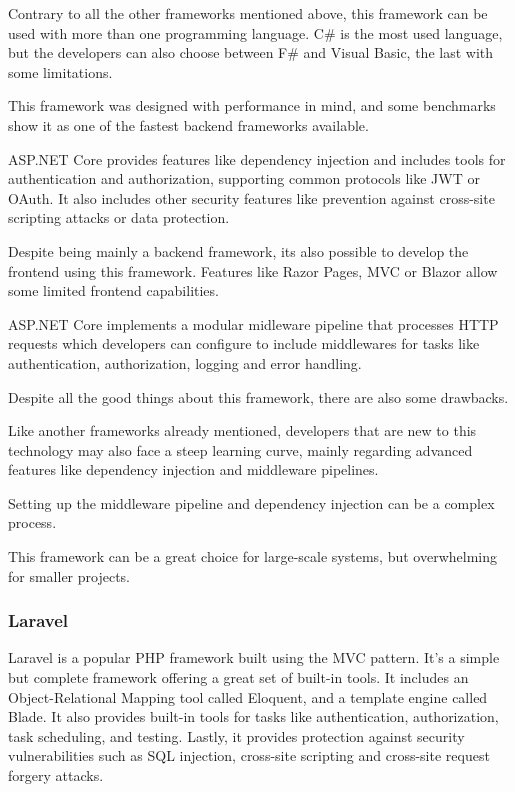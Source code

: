 Contrary to all the other frameworks mentioned above, this framework can be
used with more than one programming language. C\# is the most used language, but
the developers can also choose between F\# and Visual Basic, the last with some
limitations.

This framework was designed with performance in mind, and some benchmarks show
it as one of the fastest backend frameworks available.

ASP.NET Core provides features like dependency injection and includes tools for
authentication and authorization, supporting common protocols like \gls{JWT} or OAuth.
It also includes other security features like prevention against cross-site
scripting attacks or data protection.

Despite being mainly a backend framework, its also possible to develop the
frontend using this framework. Features like Razor Pages, \gls{MVC} or Blazor allow
some limited frontend capabilities.

ASP.NET Core implements a modular midleware pipeline that processes \gls{HTTP}
requests which developers can configure to include middlewares for tasks like
authentication, authorization, logging and error handling.

Despite all the good things about this framework, there are also some drawbacks.

Like another frameworks already mentioned, developers that are new to this
technology may also face a steep learning curve, mainly regarding advanced
features like dependency injection and middleware pipelines.

Setting up the middleware pipeline and dependency injection can be a complex
process.

This framework can be a great choice for large-scale systems, but overwhelming
for smaller projects.
\subsubsection{Laravel}
Laravel is a popular \gls{PHP} framework built using the \gls{MVC}
pattern. It's a simple but complete framework offering a great set of built-in
tools. It includes an Object-Relational Mapping tool called Eloquent, and a
template engine called Blade. It also provides built-in tools for tasks like
authentication, authorization, task scheduling, and testing. Lastly, it
provides protection against security vulnerabilities such as \gls{SQL} injection,
cross-site scripting and cross-site request forgery attacks.

